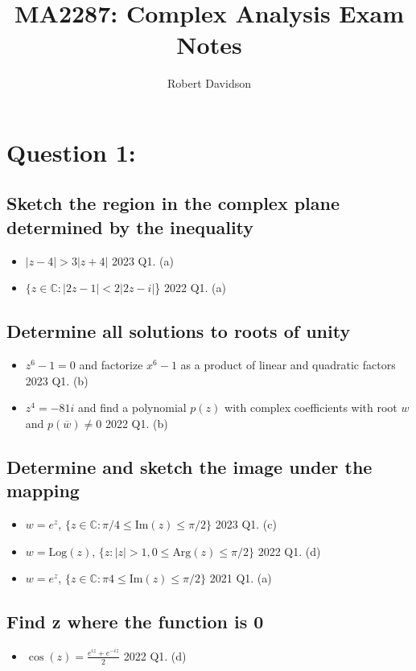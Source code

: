 \documentclass[a4paper, 10pt]{article}
\title{
\textbf{MA2287: Complex Analysis Exam Notes} \\ 
}
\author{
  Robert Davidson
}
\date{} %
\begin{document}
\maketitle
\pagebreak
\tableofcontents
\pagebreak
\small

\section{Question 1: }
\subsection{Sketch the region in the complex plane determined by the inequality}
\begin{itemize}
    \item $|z - 4| > 3|z+4|$ \hfill 2023 Q1. (a)
    \item $\{ z \in \mathbb{C} : |2z - 1| < 2|2z-i|$\} \hfill  2022 Q1. (a)
\end{itemize}
\subsection{Determine all solutions to roots of unity}
\begin{itemize}
    \item $z^6 -1 = 0$ and factorize $x^6 -1$ as a product of linear and quadratic factors \hfill 2023 Q1. (b)
    \item $z^4 = -81i$ and find a polynomial $p(z)$ with complex coefficients with root $w$ and $p(\overline{w}) \neq 0$ \hfill 2022 Q1. (b)
\end{itemize}
\subsection{Determine and sketch the image under the mapping}
\begin{itemize}
    \item $w = e^z$, $\{z \in \mathbb{C} : \pi / 4 \leq \text{Im}(z) \leq \pi /2\}$ \hfill 2023 Q1. (c)
    \item $w = \text{Log}(z)$, $\{z: |z| > 1, 0 \leq \text{Arg}(z) \leq \pi / 2\}$ \hfill 2022 Q1. (d)
    \item $w = e^z$, $\{z \in \mathbb{C} : \pi 4 \leq \text{Im}(z) \leq \pi /2\}$ \hfill 2021 Q1. (a)
\end{itemize}
\subsection{Find z where the function is 0}
\begin{itemize}
    \item $\cos(z) = \frac{e^{iz} + e^{-iz}}{2}$ \hfill 2022 Q1. (d)
\end{itemize}
\end{document}
